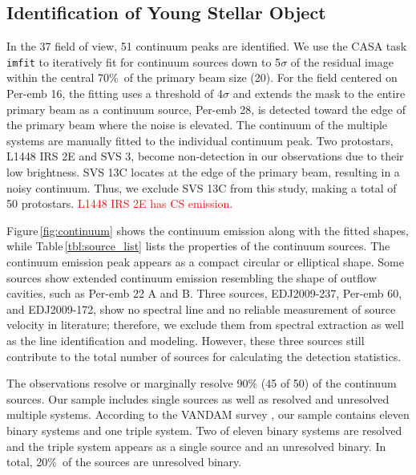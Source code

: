 \documentclass[twocolumn]{aastex62}
\begin{document}
\subsection{Identification of Young Stellar Object}
\label{sec:continuum}
In the 37 field of view, 51 continuum peaks are identified.  We use the CASA task \texttt{imfit} to iteratively fit for continuum sources down to 5$\sigma$ of the residual image within the central 70\%\ of the primary beam size (20\arcsec).  For the field centered on Per-emb 16, the fitting uses a threshold of 4$\sigma$ and extends the mask to the entire primary beam as a continuum source, Per-emb 28, is detected toward the edge of the primary beam where the noise is elevated.  The continuum of the multiple systems are manually fitted to the individual continuum peak.  Two protostars, L1448 IRS 2E and SVS 3, become non-detection in our observations due to their low brightness.  SVS 13C locates at the edge of the primary beam, resulting in a noisy continuum.  Thus, we exclude SVS 13C from this study, making a total of 50 protostars.  \textcolor{red}{L1448 IRS 2E has CS emission.}



Figure\,\ref{fig:continuum} shows the continuum emission along with the fitted shapes, while Table\,\ref{tbl:source_list} lists the properties of the continuum sources.  The continuum emission peak appears as a compact circular or elliptical shape.  Some sources show extended continuum emission resembling the shape of outflow cavities, such as Per-emb 22 A and B.  Three sources, EDJ2009-237, Per-emb 60, and EDJ2009-172, show no spectral line and no reliable measurement of source velocity in literature; therefore, we exclude them from spectral extraction as well as the line identification and modeling.  However, these three sources still contribute to the total number of sources for calculating the detection statistics.

The observations resolve or marginally resolve 90\% (45 of 50) of the continuum sources.  Our sample includes single sources as well as resolved and unresolved multiple systems.  According to the VANDAM survey \citep{2016ApJ...818...73T}, our sample contains eleven binary systems and one triple system.  Two of eleven binary systems are resolved and the triple system appears as a single source and an unresolved binary.  In total, 20\%\ of the sources are unresolved binary. 
\end{document}
